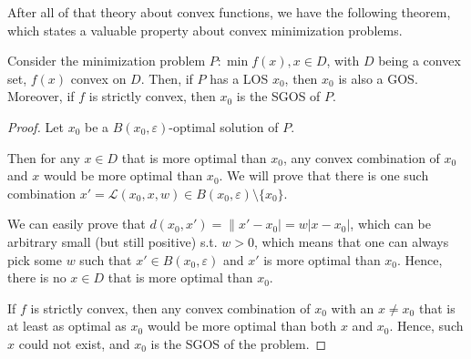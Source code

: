 After all of that theory about convex functions, we have the following theorem,
which states a valuable property about convex minimization problems.

\begin{theorem}
  Consider the minimization problem \( P: \min f(x), x \in D \), with \( D \) being
  a convex set, \( f(x) \) convex on \( D \). Then, if \( P \) has a LOS \(
  x_{0} \), then \( x_{0} \) is also a GOS. Moreover, if \( f \) is strictly
  convex, then \( x_{0} \) is the SGOS of \( P \).
\end{theorem}

\begin{proof}
  Let \( x_{0} \) be a \( B(x_{0}, \varepsilon) \)-optimal solution of \( P \).

  Then for any \( x \in D \) that is more optimal than \( x_{0} \),
  any convex combination of \( x_{0} \) and \( x \) would be more optimal than
  \( x_{0} \). We will prove that there is one such combination \( x' =
  \mathcal{L}(x_{0}, x, w) \in B(x_{0}, \varepsilon) \setminus \{x_{0}\}   \).

  We can easily prove that \( d(x_{0}, x') = \|x'-x_{0}| = w|x-x_{0}| \), which
  can be arbitrary small (but still positive)
  s.t. \( w > 0 \), which means that one can always pick
  some \( w \) such that \( x' \in B(x_{0}, \varepsilon) \) and \( x' \) is more
  optimal than \( x_{0} \). Hence, there is no \( x \in D \) that is more
  optimal than \( x_{0} \).

  If \( f \) is strictly convex, then any convex combination of \( x_{0} \) with
  an \( x \neq  x_{0}  \) that is at least as optimal as \( x_{0} \)
  would be more optimal than both \( x \) and \( x_{0} \). Hence, such \( x \)
  could not exist, and \( x_{0} \) is the SGOS of the problem.
\end{proof}



